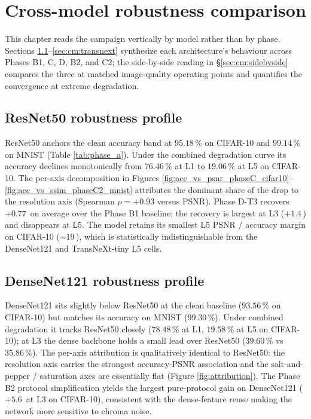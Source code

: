 \section{Cross-model robustness comparison}
\label{sec:crossmodel}

This chapter reads the campaign vertically by model rather than by phase.
Sections \ref{sec:cm:resnet}--\ref{sec:cm:transnext} synthesize each
architecture's behaviour across Phases B1, C, D, B2, and C2; the
side-by-side reading in \S \ref{sec:cm:sidebyside} compares the three at
matched image-quality operating points and quantifies the convergence at
extreme degradation.

\subsection{ResNet50 robustness profile}
\label{sec:cm:resnet}

ResNet50 anchors the clean accuracy band at $95.18\,\%$ on CIFAR-10 and
$99.14\,\%$ on MNIST (Table \ref{tab:phase_a}). Under the combined
degradation curve its accuracy declines monotonically from $76.46\,\%$
at L1 to $19.06\,\%$ at L5 on CIFAR-10. The per-axis decomposition in
Figures \ref{fig:acc_vs_psnr_phaseC_cifar10}--\ref{fig:acc_vs_ssim_phaseC2_mnist}
attributes the dominant share of the drop to the resolution axis
(Spearman $\rho = +0.93$ versus PSNR). Phase D-T3 recovers
$+0.77\,$\Mpp{} on average over the Phase B1 baseline; the recovery is
largest at L3 ($+1.4\,$\Mpp{}) and disappears at L5. The model retains
its smallest L5 PSNR / accuracy margin on CIFAR-10 ($\sim 19$\,\Mpp{}),
which is statistically indistinguishable from the DenseNet121 and
TransNeXt-tiny L5 cells.

\subsection{DenseNet121 robustness profile}
\label{sec:cm:densenet}

DenseNet121 sits slightly below ResNet50 at the clean baseline
($93.56\,\%$ on CIFAR-10) but matches its accuracy on MNIST
($99.30\,\%$). Under combined degradation it tracks ResNet50 closely
($78.48\,\%$ at L1, $19.58\,\%$ at L5 on CIFAR-10); at L3 the dense
backbone holds a small lead over ResNet50 ($39.60\,\%$ vs $35.86\,\%$).
The per-axis attribution is qualitatively identical to ResNet50: the
resolution axis carries the strongest accuracy-PSNR association and the
salt-and-pepper / saturation axes are essentially flat (Figure
\ref{fig:attribution}). The Phase B2 protocol simplification
yields the largest pure-protocol gain on DenseNet121 ($+5.6\,$\Mpp{} at
L3 on CIFAR-10), consistent with the dense-feature reuse making the
network more sensitive to chroma noise.

